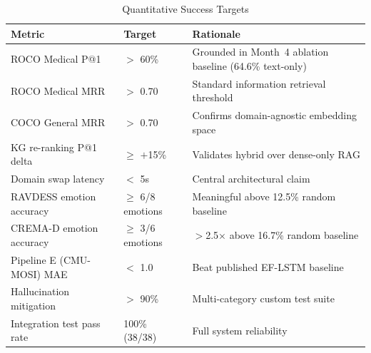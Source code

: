 \documentclass[12pt, a4paper]{article}
\begin{document}
\begin{table}[h!]
\centering
\caption{Quantitative Success Targets}
\label{tab:targets}
\renewcommand{\arraystretch}{1.3}
\begin{tabularx}{\textwidth}{@{}p{5.5cm} p{2.8cm} p{5.0cm}@{}}
\toprule
\textbf{Metric} & \textbf{Target} & \textbf{Rationale} \\
\midrule
ROCO Medical P@1            & $>$ 60\%     & Grounded in Month~4 ablation baseline (64.6\% text-only) \\
ROCO Medical MRR            & $>$ 0.70     & Standard information retrieval threshold \\
COCO General MRR            & $>$ 0.70     & Confirms domain-agnostic embedding space \\
KG re-ranking P@1 delta     & $\geq$ $+$15\%  & Validates hybrid over dense-only RAG \\
Domain swap latency         & $<$ 5s       & Central architectural claim \\
RAVDESS emotion accuracy    & $\geq$ 6/8 emotions & Meaningful above 12.5\% random baseline \\
CREMA-D emotion accuracy    & $\geq$ 3/6 emotions & $>$2.5$\times$ above 16.7\% random baseline \\
Pipeline E (CMU-MOSI) MAE   & $<$ 1.0      & Beat published EF-LSTM baseline \\
Hallucination mitigation    & $>$ 90\%     & Multi-category custom test suite \\
Integration test pass rate  & 100\% (38/38)& Full system reliability \\
\bottomrule
\end{tabularx}
\end{table}



\end{document}
